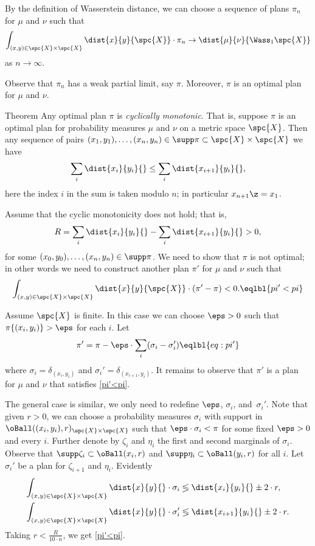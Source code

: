 By the definition of Wasserstein distance, we can choose a sequence of plans $\pi_n$ for $\mu$ and $\nu$ such that 
\[\int_{(x,y)\in\spc{X}\times\spc{X}}\dist{x}{y}{\spc{X}}\cdot\pi_n\to \dist{\mu}{\nu}{\Wass_1\spc{X}}\]
as $n\to \infty$.

Observe that $\pi_n$ has a weak partial limit, say $\pi$.
Moreover, $\pi$ is an optimal plan for $\mu$ and $\nu$.
\qeds

\begin{thm}{Theorem}
Any optimal plan $\pi$ is \emph{cyclically monotonic}.
That is, suppose $\pi$ is an optimal plan for probability measures $\mu$ and $\nu$ on a metric space $\spc{X}$.
Then any sequence of pairs $(x_1,y_1),\dots,(x_n,y_n)\in\supp\pi\subset\spc{X}\times\spc{X}$ we have
\[\sum_i\dist{x_i}{y_i}{}
\le
\sum_i\dist{x_{i+1}}{y_i}{},\]
here the index $i$ in the sum is taken modulo $n$; in particular $x_{n+1}\z=x_1$.
\end{thm}

Assume that the cyclic monotonicity does not hold;
that is,
\[R=\sum_i\dist{x_i}{y_i}{}
-
\sum_i\dist{x_{i+1}}{y_i}{}>0,\]
for some $(x_0,y_0),\dots,(x_n,y_n)\in\supp\pi$.
We need to show that $\pi$ is not optimal;
in other words we need to construct another plan $\pi'$ for $\mu$ and $\nu$ such that 
\[\int_{(x,y)\in\spc{X}\times\spc{X}}\dist{x}{y}{\spc{X}}\cdot(\pi'-\pi)<0.\eqlbl{pi'<pi}\]

Assume $\spc{X}$ is finite.
In this case we can choose $\eps>0$ such that 
$\pi\{(x_i,y_i)\}>\eps$ for each $i$.
Let
\[\pi'=\pi-\eps\cdot\sum_i(\sigma_i-\sigma_i')\eqlbl{eq:pi'}\]
where $\sigma_i=\delta_{(x_i,y_i)}$ and $\sigma_i'=\delta_{(x_{i+1},y_i)}$.
It remains to observe that $\pi'$ is a plan for $\mu$ and $\nu$ that satisfies \ref{pi'<pi}.

The general case is similar, we only need to redefine $\eps$, $\sigma_i$, and~$\sigma_i'$.
Note that given $r>0$, we can choose a probability measures $\sigma_i$ with support in $\oBall((x_i,y_i),r)_{\spc{X}\times\spc{X}}$ such that $\eps\cdot \sigma_i<\pi$ for some fixed $\eps>0$ and every $i$.
Further denote by $\zeta_i$ and $\eta_i$ the first and second marginals of $\sigma_i$.
Observe that $\supp\zeta_i\subset\oBall(x_i,r)$ and $\supp\eta_i\subset\oBall(y_i,r)$ for all $i$.
Let $\sigma_i'$ be a plan for $\zeta_{i+1}$ and $\eta_i$.
Evidently 
\begin{align*}
\int_{(x,y)\in\spc{X}\times\spc{X}}\dist{x}{y}{}\cdot \sigma_i
&\lessgtr
\dist{x_i}{y_i}{}\pm 2\cdot r,
\\
\int_{(x,y)\in\spc{X}\times\spc{X}}\dist{x}{y}{}\cdot \sigma_i'
&\lessgtr
\dist{x_{i+1}}{y_i}{}\pm 2\cdot r.
\end{align*}
Taking $r<\tfrac R{10\cdot n}$, we get  \ref{pi'<pi}. 
\qeds





